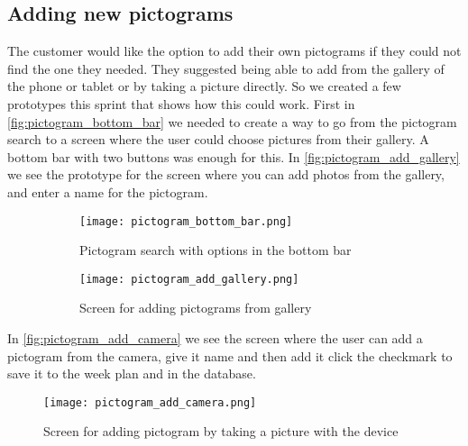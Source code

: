 \subsection{Adding new pictograms}
The customer would like the option to add their own pictograms if they could not find the one they needed. They suggested being able to add from the gallery of the phone or tablet or by taking a picture directly. So we created a few prototypes this sprint that shows how this could work. First in \autoref{fig:pictogram_bottom_bar} we needed to create a way to go from the pictogram search to a screen where the user could choose pictures from their gallery.
A bottom bar with two buttons was enough for this. In \autoref{fig:pictogram_add_gallery} we see the prototype for the screen where you can add photos from the gallery, and enter a name for the pictogram.
\begin{figure}[H]
    \begin{subfigure}{0.5\textwidth}
    \texttt{[image: pictogram\_bottom\_bar.png]} 
    \caption{Pictogram search with options in the bottom bar}
    \label{fig:pictogram_bottom_bar}
    \end{subfigure}
    \begin{subfigure}{0.5\textwidth}
        \texttt{[image: pictogram\_add\_gallery.png]}
    \caption{Screen for adding pictograms from gallery}
    \label{fig:pictogram_add_gallery}
    \end{subfigure} 
    \caption{}
    \label{fig:pictogram_bottom_bar_and_pictogram_add_gallery}
\end{figure}
In \autoref{fig:pictogram_add_camera} we see the screen where the user can add a pictogram from the camera, give it name and then add it click the checkmark to save it to the week plan and in the database.

\begin{figure}
    \centering
    \texttt{[image: pictogram\_add\_camera.png]}
    \caption{Screen for adding pictogram by taking a picture with the device}
    \label{fig:pictogram_add_camera}
\end{figure}